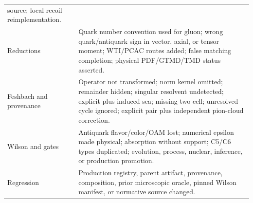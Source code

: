 \documentclass[11pt]{article}
\begin{document}
\begin{longtable}{L{0.18\textwidth}L{0.72\textwidth}}
source; local recoil reimplementation.\\
Reductions & Quark number convention used for gluon; wrong quark/antiquark sign
in vector, axial, or tensor moment; WTI/PCAC routes added; false matching
completion; physical PDF/GTMD/TMD status asserted.\\
Feshbach and provenance & Operator not transformed; norm kernel omitted;
remainder hidden; singular resolvent undetected; explicit plus induced sea;
missing two-cell; unresolved cycle ignored; explicit pair plus independent
pion-cloud correction.\\
Wilson and gates & Antiquark flavor/color/OAM lost; numerical epsilon made
physical; absorption without support; C5/C6 types duplicated; evolution,
process, nuclear, inference, or production promotion.\\
Regression & Production registry, parent artifact, provenance, composition,
prior microscopic oracle, pinned Wilson manifest, or normative source changed.\\
\bottomrule
\end{longtable}
\end{document}
